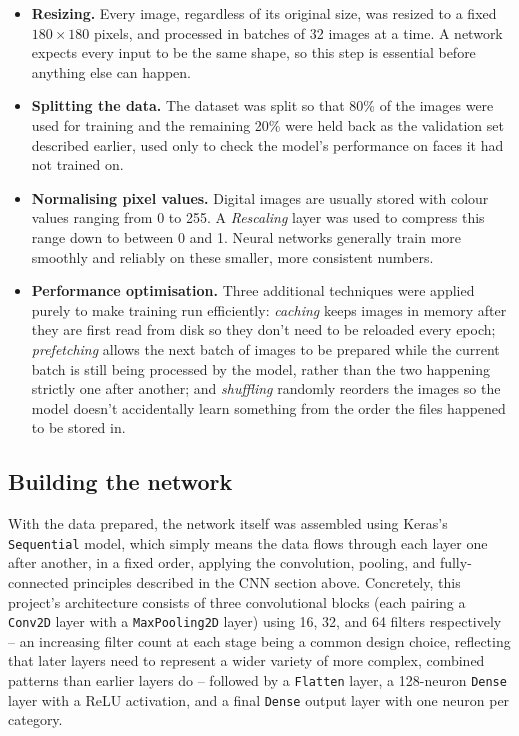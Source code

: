 \documentclass[11 pt , a 4 paper ]{article}
\theoremstyle{definition}
\begin{document}
\begin{itemize}[leftmargin=1.5em]
	\item \textbf{Resizing.} Every image, regardless of its original size, was resized to a fixed $180 \times 180$ pixels, and processed in batches of 32 images at a time. A network expects every input to be the same shape, so this step is essential before anything else can happen.
	\item \textbf{Splitting the data.} The dataset was split so that 80\% of the images were used for training and the remaining 20\% were held back as the validation set described earlier, used only to check the model's performance on faces it had not trained on.
	\item \textbf{Normalising pixel values.} Digital images are usually stored with colour values ranging from 0 to 255. A \emph{Rescaling} layer was used to compress this range down to between 0 and 1. Neural networks generally train more smoothly and reliably on these smaller, more consistent numbers.
	\item \textbf{Performance optimisation.} Three additional techniques were applied purely to make training run efficiently: \emph{caching} keeps images in memory after they are first read from disk so they don't need to be reloaded every epoch; \emph{prefetching} allows the next batch of images to be prepared while the current batch is still being processed by the model, rather than the two happening strictly one after another; and \emph{shuffling} randomly reorders the images so the model doesn't accidentally learn something from the order the files happened to be stored in.
\end{itemize}
 
\subsection{Building the network}
 
With the data prepared, the network itself was assembled using Keras's \texttt{Sequential} model, which simply means the data flows through each layer one after another, in a fixed order, applying the convolution, pooling, and fully-connected principles described in the CNN section above. Concretely, this project's architecture consists of three convolutional blocks (each pairing a \texttt{Conv2D} layer with a \texttt{MaxPooling2D} layer) using 16, 32, and 64 filters respectively -- an increasing filter count at each stage being a common design choice, reflecting that later layers need to represent a wider variety of more complex, combined patterns than earlier layers do -- followed by a \texttt{Flatten} layer, a 128-neuron \texttt{Dense} layer with a ReLU activation, and a final \texttt{Dense} output layer with one neuron per category.\\
 
\end{document}
